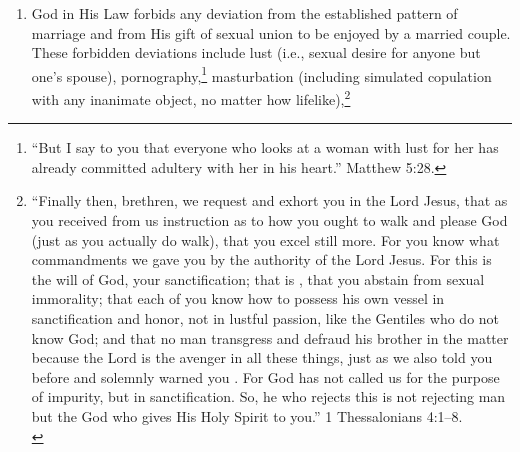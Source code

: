 \documentclass[
]{book}
\begin{document}
\begin{enumerate}
{    \strut \\
    ``For truly I say to you, until heaven and earth pass away, not the smallest letter or stroke shall pass from the Law until all is accomplished.'' Matthew 5:18.} Since marriage is a lifelong and monogamous union, God forbids divorce except in two circumstances: (1)~when one spouse abandons the other,\footnote{See 1~Corinthians 7:12--13, 15--16. Abandonment or ``wilful desertion'' (WCF 24.6) is not limited only to cases of one spouse's unjustified departure and refusal to be reconciled to the abandoned or injured spouse. A state of willful desertion also exists if the offending party's conduct is so egregious that the injured party is forced to leave the marital home and reconciliation is impossible due to the nature or seriousness of the sin and the offending party's persistent impenitence.} and (2)~when a spouse engages in sexual immorality.\footnote{``It was said, `Whoever sends his wife away, let him give her a certificate of divorce'; but I say to you that everyone who divorces his wife, except for the reason of unchastity, makes her commit adultery; and whoever marries a divorced woman commits adultery.'' Matthew 5:31--32. See also WCF 24.6.}
\item
  God in His Law forbids any deviation from the established pattern of marriage and from His gift of sexual union to be enjoyed by a married couple. These forbidden deviations include lust (i.e., sexual desire for anyone but one's spouse), pornography,\footnote{``But I say to you that everyone who looks at a woman with lust for her has already committed adultery with her in his heart.'' Matthew 5:28.} masturbation (including simulated copulation with any inanimate object, no matter how lifelike),\footnote{``Finally then, brethren, we request and exhort you in the Lord Jesus, that as you received from us instruction as to how you ought to walk and please God (just as you actually do walk), that you excel still more. For you know what commandments we gave you by the authority of the Lord Jesus. For this is the will of God, your sanctification; that is , that you abstain from sexual immorality; that each of you know how to possess his own vessel in sanctification and honor, not in lustful passion, like the Gentiles who do not know God; and that no man transgress and defraud his brother in the matter because the Lord is the avenger in all these things, just as we also told you before and solemnly warned you . For God has not called us for the purpose of impurity, but in sanctification. So, he who rejects this is not rejecting man but the God who gives His Holy Spirit to you.'' 1 Thessalonians 4:1--8.\\
}
\end{enumerate}
\end{document}
